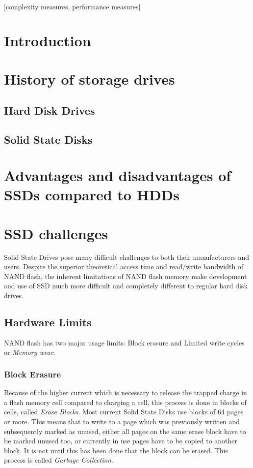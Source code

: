 \documentclass{acm_proc_article-sp}
\begin{document}
[complexity measures, performance measures]

\section{Introduction}

\section{History of storage drives}

\subsection{Hard Disk Drives}

\subsection{Solid State Disks}

\section{Advantages and disadvantages of SSDs compared to HDDs}

\section{SSD challenges}

Solid State Drives pose many difficult challenges to both their manufacturers and users. Despite the superior theoretical access time and read/write bandwidth of NAND flash, the inherent limitations of NAND flash memory make development and use of SSD much more difficult and completely different to regular hard disk drives.

\subsection{Hardware Limits}

NAND flash has two major usage limits: Block erasure and Limited write cycles or \emph{Memory wear}.

\subsubsection{Block Erasure}
Because of the higher current which is necessary to release the trapped charge in a flash memory cell compared to charging a cell, this process is done in blocks of cells, called \emph{Erase Blocks}. Most current Solid State Disks use blocks of 64 pages or more. %
This means that to write to a page which was previously written and subsequently marked as unused, either all pages on the same erase block have to be marked unused too, or currently in use pages have to be copied to another block. It is not until this has been done that the block can be erased. This process is called \emph{Garbage Collection}.
\end{document}
